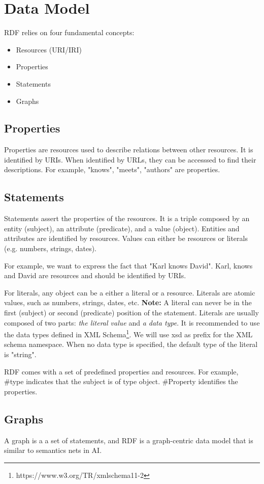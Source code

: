 \documentclass{article}
\theoremstyle{definition}
\begin{document}
\section{Data Model}

RDF relies on four fundamental concepts:
\begin{itemize}
    \item Resources (URI/IRI)
    \item Properties
    \item Statements
    \item Graphs
\end{itemize}

\subsection{Properties}

Properties are resources used to describe relations between other resources. It is identified by URIs. When identified by URLs, they can be accesssed to find their descriptions. For example, "knows", "meets", "authors" are properties.

\subsection{Statements}

Statements assert the properties of the resources. It is a triple composed by an entity (subject), an attribute (predicate), and a value (object). Entities and attributes are identified by resources. Values can either be resources or literals (e.g. numbers, strings, dates).

For example, we want to express the fact that "Karl knows David". Karl, knows and David are resources and should be identified by URIs.

For literals, any object can be a either a literal or a resource. Literals are atomic values, such as numbers, strings, dates, etc. \textbf{Note:} A literal can never be in the first (subject) or second (predicate) position of the statement. Literals are usually composed of two parts: \textit{the literal value} and \textit{a data type}. It is recommended to use the data types defined in XML Schema\footnote{https://www.w3.org/TR/xmlschema11-2}. We will use xsd as prefix for the XML schema namespace. When no data type is specified, the default type of the literal is "string".

RDF comes with a set of predefined properties and resources. For example, #type indicates that the subject is of type object. #Property identifies the properties.

\subsection{Graphs}

A graph is a a set of statements, and RDF is a graph-centric data model that is similar to semantics nets in AI. 
\end{document}
